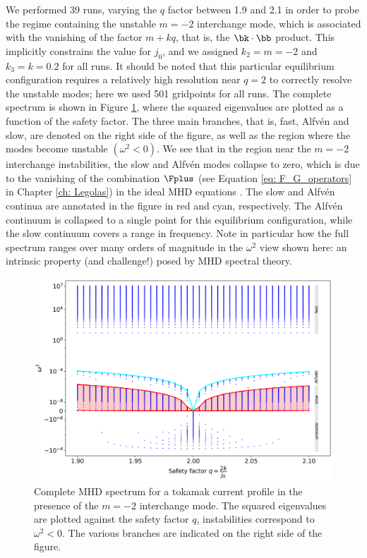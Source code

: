 We performed 39 runs, varying the $q$ factor between 1.9 and 2.1 in order to probe the regime containing the unstable $m = -2$ interchange mode, which is associated with the vanishing of the factor $m + kq$, that is, the $\bk \cdot \bb$ product. This implicitly constrains the value for $j_0$, and we assigned $k_2 = m = -2$ and $k_3 = k = 0.2$ for all runs. It should be noted that this particular equilibrium configuration requires a relatively high resolution near $q = 2$ to correctly resolve the unstable modes; here we used 501 gridpoints for all runs. The complete spectrum is shown in Figure \ref{fig: tokamak_current}, where the squared eigenvalues are plotted as a function of the safety factor. The three main branches, that is, fast, Alfv\'en and slow, are denoted on the right side of the figure, as well as the region where the modes become unstable $(\omega^2 < 0)$. We see that in the region near the $m = -2$ interchange instabilities, the slow and Alfv\'en modes collapse to zero, which is due to the vanishing of the combination $\Fplus$ (see Equation \eqref{eq: F_G_operators} in Chapter \ref{ch: Legolas}) in the ideal MHD equations \citep{book_MHD}. The slow and Alfv\'en continua are annotated in the figure in red and cyan, respectively. The Alfv\'en continuum is collapsed to a single point for this equilibrium configuration, while the slow continuum covers a range in frequency. Note in particular how the full spectrum ranges over many orders of magnitude in the $\omega^2$ view shown here: an intrinsic property (and challenge!) posed by MHD spectral theory.

\begin{figure}[t]
  \centering
  \includegraphics[width=\textwidth]{kerner_tokamak.png}
  \caption{
    Complete MHD spectrum for a tokamak current profile in the presence of the $m = -2$ interchange mode. The squared eigenvalues are plotted against the safety factor $q$, instabilities correspond to $\omega^2 < 0$. The various branches are indicated on the right side of the figure.
  }
  \label{fig: tokamak_current}
\end{figure}

